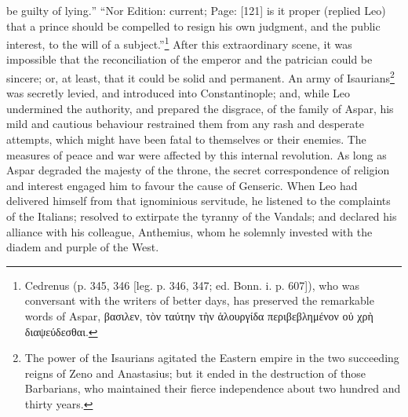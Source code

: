 be guilty of lying.\texthebrew{” “}Nor Edition: current; Page: [121] is it proper (replied Leo) that a prince should be compelled to resign his own judgment, and the public interest, to the will of a subject.\texthebrew{}”\footnote{Cedrenus (p. 345, 346 [leg. p. 346, 347; ed. Bonn. i. p. 607]), who was conversant with the writers of better days, has preserved the remarkable words of Aspar, \textgreek{βασιλεν, τ\texthebrew{ὸ}ν ταύτην τ\texthebrew{ὴ}ν \texthebrew{ἁ}λουργίδα περιβεβλημένον ο\texthebrew{ὐ} χρ\texthebrew{ὴ} διαψεύδεσθαι}.} After this extraordinary scene, it was impossible that the reconciliation of the emperor and the patrician could be sincere; or, at least, that it could be solid and permanent. An army of Isaurians\footnote{The power of the Isaurians agitated the Eastern empire in the two succeeding reigns of Zeno and Anastasius; but it ended in the destruction of those Barbarians, who maintained their fierce independence about two hundred and thirty years.} was secretly levied, and introduced into Constantinople; and, while Leo undermined the authority, and prepared the disgrace, of the family of Aspar, his mild and cautious behaviour restrained them from any rash and desperate attempts, which might have been fatal to themselves or their enemies. The measures of peace and war were affected by this internal revolution. As long as Aspar degraded the majesty of the throne, the secret correspondence of religion and interest engaged him to favour the cause of Genseric. When Leo had delivered himself from that ignominious servitude, he listened to the complaints of the Italians; resolved to extirpate the tyranny of the Vandals; and declared his alliance with his colleague, Anthemius, whom he solemnly invested with the diadem and purple of the West.

